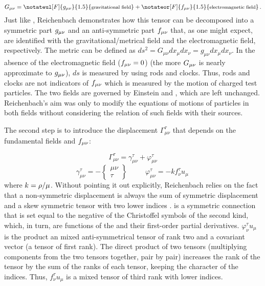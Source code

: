 \documentclass[final]{article}
\newcommand{\faradaymn}{\ensuremath{f\mn}}
\newcommand{\ctmrd}{\ensuremath{\hfrac{\rho}{\mu}}\xspace}
\begin{document}
\begin{equation}
\label{eq:ft} 
G_{\mu\nu}=\notateul[F]{g_{\mu\nu}}{1.5}{\texts{gravitational field}}+\notateor[F]{f_{\mu\nu}}{1.5}{\texts{electromagnetic field}}\,.
\end{equation}
%
Just like \citet{Eddington1921}, Reichenbach demonstrates how this tensor can be decomposed into a symmetric part $g_{\mu\nu}$ and an anti-symmetric part $f_{\mu\nu}$ that, as one might expect, are identified with the gravitational/metrical field and the electromagnetic field, respectively. The metric can be defined as $d s^2=G_{\mu\nu}d x_\mu d x_\nu= g_{\mu\nu}d x_\mu d x_\nu$. In the absence of the electromagnetic field ($f_{\mu\nu}=0$) (the more $G_{\mu\nu}$ is nearly approximate to $g_{\mu\nu}$), $ds$ is measured by using rods and clocks. Thus, rods and clocks are not indicators of $f_{\mu\nu}$ which is measured by the motion of charged test particles. The two fields are governed by Einstein and \ME, which are left unchanged. Reichenbach's aim was only to modify the equations of motions of particles in both fields without considering the relation of such fields with their sources. 

The second step is to introduce the displacement $\Gamma_{\mu\nu}^{\tau}$ that depends on the fundamental fields \gmn and \faradaymn:

\begin{equation}
\label{eq:ds}
\Gamma_{\mu\nu}^{\tau}=\gamma_{\mu\nu}^{\tau}+\varphi_{\mu\nu}^{\tau}
\end{equation}
%
\begin{equation}
\label{eq:dsd}
\gamma^\tau_{\mu\nu}=-\begin{Bmatrix} \mu\nu \\ \tau \end{Bmatrix} \;\;\;\;\;\;\;\;\; \varphi^{\tau}_{\mu\nu}=-k f^\tau_\nu u_\mu\,
\end{equation}
%
where $k=\ctmrd$. Without pointing it out explicitly, Reichenbach relies on the fact that a non-symmetric displacement is always the sum of symmetric displacement and a skew symmetric tensor with two lower indices \citep[see][851]{Schouten1924}. \gtmn is a symmetric connection that is set equal to the negative of the Christoffel symbols of the second kind, which, in turn, are functions of the \gmn and their first-order partial derivatives. $\varphi^\tau_\nu u_\mu$ is the product an mixed anti-symmetrical tensor of rank two and a covariant vector (a tensor of first rank). The direct product of two tensors (multiplying components from the two tensors together, pair by pair) increases the rank of the tensor by the sum of the ranks of each tensor, keeping the character of the indices. Thus, $f^\tau_\nu u_\mu$ is a mixed tensor of third rank with lower indices.
\end{document}
